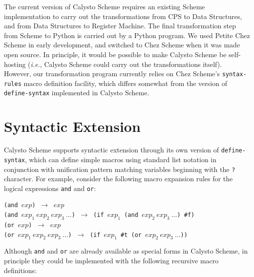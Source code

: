 \documentclass[acmsmall,screen,nonacm]{acmart}
\begin{document}
The current version of Calysto Scheme requires an existing Scheme
implementation to carry out the transformations from CPS to Data Structures,
and from Data Structures to Register Machine.  The final transformation step
from Scheme to Python is carried out by a Python program.  We used Petite Chez
Scheme in early development, and switched to Chez Scheme when it was made open
source. In principle, it would be possible to make Calysto Scheme be
self-hosting (\emph{i.e.}, Calysto Scheme could carry out the transformations
itself). However, our transformation program currently relies on Chez Scheme's
\texttt{syntax-rules} macro definition facility, which differs somewhat from
the version of \texttt{define-syntax} implemented in Calysto Scheme.

\pagebreak

\section{Syntactic Extension}

\noindent
Calysto Scheme supports syntactic extension through its own version of
\texttt{define-syntax}, which can define simple macros using standard list
notation in conjunction with unification pattern matching variables beginning
with the \texttt{?} character.  For example, consider the following macro
expansion rules for the logical expressions \texttt{and} and \texttt{or}:\\

\begin{minipage}{\textwidth}
\texttt{(and $\mathit{exp}$)} $~\rightarrow~$ $\mathit{exp}$\\
\texttt{(and $\mathit{exp}_1~\mathit{exp}_2~\mathit{exp}_3~\ldots$)} $~\rightarrow~$
\texttt{(if $\mathit{exp}_1$ (and $\mathit{exp}_2~\mathit{exp}_3~\ldots$) \#f)}\\

\texttt{(or $\mathit{exp}$)} $~\rightarrow~$ $\mathit{exp}$\\
\texttt{(or $\mathit{exp}_1~\mathit{exp}_2~\mathit{exp}_3~\ldots$)} $~\rightarrow~$
\texttt{(if $\mathit{exp}_1$ \#t (or $\mathit{exp}_2~\mathit{exp}_3~\ldots$))}\\
\end{minipage}

\noindent
Although \texttt{and} and \texttt{or} are already available as special forms in
Calysto Scheme, in principle they could be implemented with the following
recursive macro definitions:\\
\end{document}
